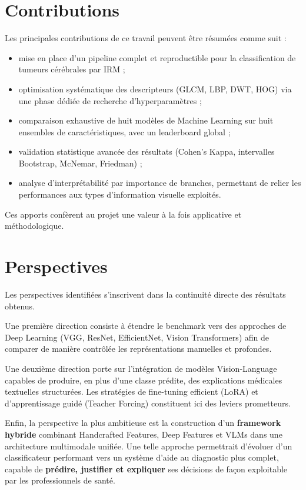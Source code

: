 \section*{Contributions}
Les principales contributions de ce travail peuvent être résumées comme suit :
\begin{itemize}[leftmargin=1.4em,itemsep=2pt]
  \item mise en place d'un pipeline complet et reproductible pour la classification de
  tumeurs cérébrales par IRM ;
  \item optimisation systématique des descripteurs (GLCM, LBP, DWT, HOG) via une phase dédiée
  de recherche d'hyperparamètres ;
  \item comparaison exhaustive de huit modèles de Machine Learning sur huit ensembles de
  caractéristiques, avec un leaderboard global ;
  \item validation statistique avancée des résultats (Cohen's Kappa, intervalles Bootstrap,
  McNemar, Friedman) ;
  \item analyse d'interprétabilité par importance de branches, permettant de relier les
  performances aux types d'information visuelle exploités.
\end{itemize}

Ces apports confèrent au projet une valeur à la fois applicative et méthodologique.

\section*{Perspectives}
Les perspectives identifiées s'inscrivent dans la continuité directe des résultats obtenus.

Une première direction consiste à étendre le benchmark vers des approches de
Deep Learning (VGG, ResNet, EfficientNet, Vision Transformers) afin de comparer de manière
contrôlée les représentations manuelles et profondes.

Une deuxième direction porte sur l'intégration de modèles Vision-Language capables de
produire, en plus d'une classe prédite, des explications médicales textuelles structurées.
Les stratégies de fine-tuning efficient (LoRA) et d'apprentissage guidé (Teacher Forcing)
constituent ici des leviers prometteurs.

Enfin, la perspective la plus ambitieuse est la construction d'un \textbf{framework hybride}
combinant Handcrafted Features, Deep Features et VLMs dans une architecture multimodale
unifiée. Une telle approche permettrait d'évoluer d'un classificateur performant vers un
système d'aide au diagnostic plus complet, capable de \textbf{prédire, justifier et
expliquer} ses décisions de façon exploitable par les professionnels de santé.
